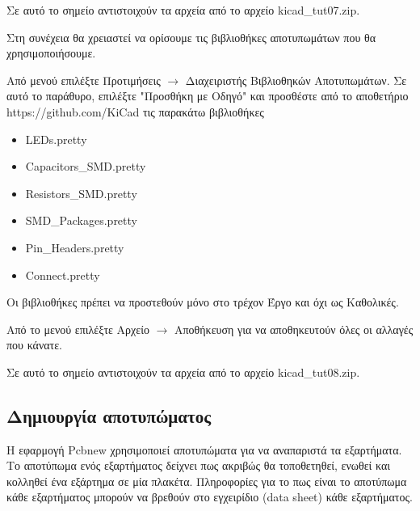 \documentclass[a4paper]{article}
\begin{document}
Σε αυτό το σημείο αντιστοιχούν τα αρχεία από το αρχείο kicad\_tut07.zip.

Στη συνέχεια θα χρειαστεί να ορίσουμε τις βιβλιοθήκες αποτυπωμάτων που θα χρησιμοποιήσουμε. 

Από μενού επιλέξτε Προτιμήσεις $\rightarrow$ Διαχειριστής Βιβλιοθηκών Αποτυπωμάτων. Σε αυτό το παράθυρο, επιλέξτε "Προσθήκη με Οδηγό" και προσθέστε από το αποθετήριο https://github.com/KiCad τις παρακάτω βιβλιοθήκες 

\begin{itemize}
    \item \textenglish{LED}s.pretty
    \item Capacitors\_SMD.pretty
    \item Resistors\_SMD.pretty
    \item SMD\_Packages.pretty
    \item Pin\_Headers.pretty
    \item Connect.pretty
\end{itemize}

Οι βιβλιοθήκες πρέπει να προστεθούν μόνο στο τρέχον Έργο και όχι ως Καθολικές.

\begin{figure}
  \begin{center}
    \label{fig:kicad-main}
  \end{center}
\end{figure}

\begin{figure}
  \begin{center}
    \label{fig:kicad-main}
  \end{center}
\end{figure}


Από το μενού επιλέξτε Αρχείο $\rightarrow$ Αποθήκευση για να αποθηκευτούν όλες οι αλλαγές που κάνατε.

Σε αυτό το σημείο αντιστοιχούν τα αρχεία από το αρχείο kicad\_tut08.zip.

\subsection{Δημιουργία αποτυπώματος}
Η εφαρμογή \textenglish{Pcbnew} χρησιμοποιεί αποτυπώματα για να αναπαριστά τα εξαρτήματα. Το αποτύπωμα ενός εξαρτήματος δείχνει πως ακριβώς θα τοποθετηθεί, ενωθεί και κολληθεί ένα εξάρτημα σε μία πλακέτα. Πληροφορίες για το πως είναι το αποτύπωμα κάθε εξαρτήματος μπορούν να βρεθούν στο εγχειρίδιο (data sheet) κάθε εξαρτήματος. 
\end{document}
